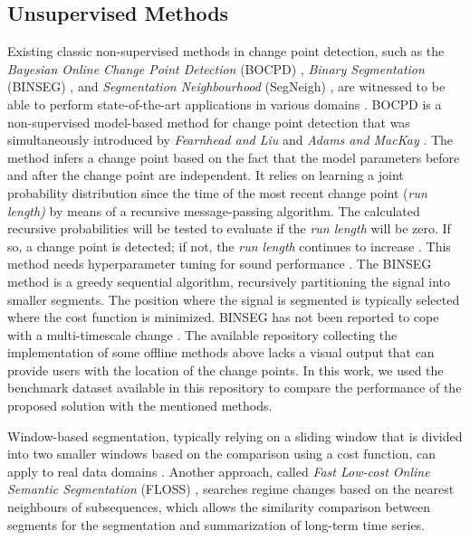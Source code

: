 \subsection{Unsupervised Methods}

Existing classic non-supervised methods in change point detection, such as the \textit{Bayesian Online Change Point Detection} (BOCPD) \cite{bocpd, bocpd2}, \textit{Binary Segmentation} (BINSEG) \cite{binseg}, and \textit{Segmentation Neighbourhood} (SegNeigh) \cite{segneigh}, are witnessed to be able to perform state-of-the-art applications in various domains \cite{cpd_alan}. 
BOCPD is a non-supervised model-based method for change point detection that was simultaneously introduced by \textit{Fearnhead and Liu} \cite{bocpd2} and \textit{Adams and MacKay} \cite{bocpd}. The method infers a change point based on the fact that the model parameters before and after the change point are independent. It relies on learning a joint probability distribution since the time of the most recent change point (\textit{run length)} by means of a recursive message-passing algorithm. The calculated recursive probabilities will be tested to evaluate if the \textit{run length} will be zero. If so, a change point is detected; if not, the \textit{run length} continues to increase \cite{bocpd, cpd_alan}. This method needs hyperparameter tuning for sound performance \cite{cpd_alan}. The BINSEG method is a greedy sequential algorithm, recursively partitioning the signal into smaller segments. The position where the signal is segmented is typically selected where the cost function is minimized. BINSEG has not been reported to cope with a multi-timescale change \cite{cpd_alan, binseg}. The available repository \cite{cpd_alan} collecting the implementation of some offline methods \cite{review_2} above lacks a visual output that can provide users with the location of the change points. In this work, we used the benchmark dataset available in this repository to compare the performance of the proposed solution with the mentioned methods.

Window-based segmentation, typically relying on a sliding window that is divided into two smaller windows based on the comparison using a cost function, can apply to real data domains \cite{review_2}. Another approach, called \textit{Fast Low-cost Online Semantic Segmentation} (FLOSS) \cite{floss, eamonn_segmentation}, searches regime changes based on the nearest neighbours of subsequences, which allows the similarity comparison between segments for the segmentation and summarization of long-term time series.

